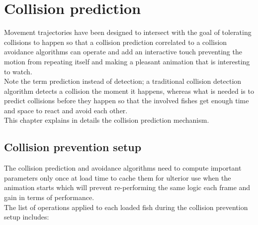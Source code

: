 \chapter{Collision prediction}
Movement trajectories have been designed to intersect with the goal of tolerating collisions to happen so that a collision prediction correlated to a collision avoidance algorithms can operate and add an interactive touch preventing the motion from repeating itself and making a pleasant animation that is interesting to watch.\\

Note the term prediction instead of detection; a traditional collision detection algorithm detects a collision the moment it happens, whereas what is needed is to predict collisions before they happen so that the involved fishes get enough time and space to react and avoid each other.\\

This chapter explains in details the collision prediction mechanism.

\section{Collision prevention setup}
\label{sec:setup}
The collision prediction and avoidance algorithms need to compute important parameters only once at load time to cache them for ulterior use when the animation starts which will prevent re-performing the same logic each frame and gain in terms of performance.\\

The list of operations applied to each loaded fish during the collision prevention setup includes:


